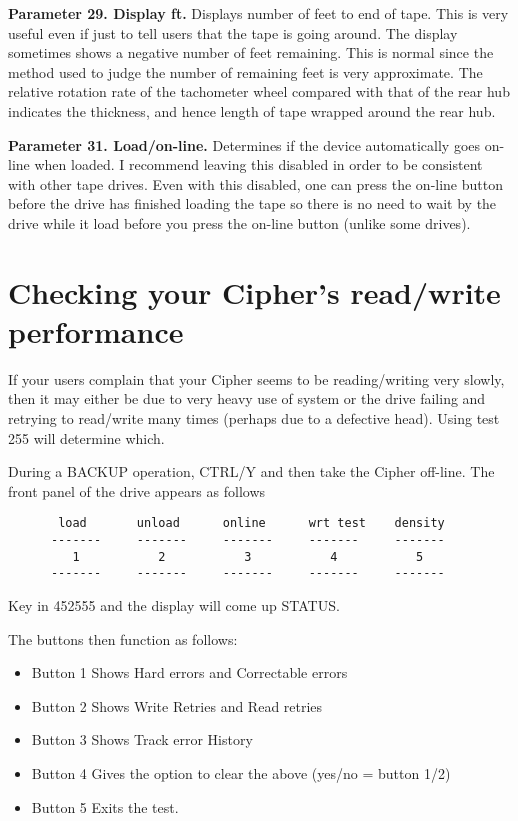 {\bf Parameter 29. Display ft.} Displays number of feet to end of tape. This is very useful
even if just to tell users that  the tape is going around.
The display sometimes shows a negative number of feet remaining.
This is normal since the method used to judge the number of remaining feet is
very approximate. The relative rotation rate of the tachometer wheel compared
with that of the rear hub indicates the thickness,
and hence length of tape wrapped around the rear hub.

{\bf Parameter 31. Load/on-line.} Determines if the device automatically goes on-line when
loaded. I recommend leaving this disabled in order to be consistent with other
tape drives. Even with this disabled, one can press the on-line button
before the drive has finished loading the tape so there is no need to
wait by the drive while it load before you press the on-line button
(unlike some drives).


\section{Checking your Cipher's read/write performance}

If your users complain that your Cipher seems to be
reading/writing very slowly, then it may either be due to
very heavy use of system or the drive failing and retrying to read/write
many times (perhaps due to a defective head). Using test 255 will
determine which.

During a BACKUP operation, CTRL/Y and then take the Cipher off-line.
The front panel of the drive appears as follows

\begin{verbatim}
       load       unload      online      wrt test    density
      -------     -------     -------     -------     -------
         1           2           3           4           5
      -------     -------     -------     -------     -------
\end{verbatim}

Key in 452555 and the display will come up STATUS.

The buttons then function as follows:

\begin{itemize}

\item Button 1 \qquad	Shows Hard errors and Correctable errors

\item Button 2 \qquad	Shows Write Retries and Read retries

\item Button 3 \qquad	Shows Track error History

\item Button 4 \qquad	Gives the option to clear the above (yes/no = button 1/2)

\item Button 5 \qquad	Exits the test.

\end{itemize}

